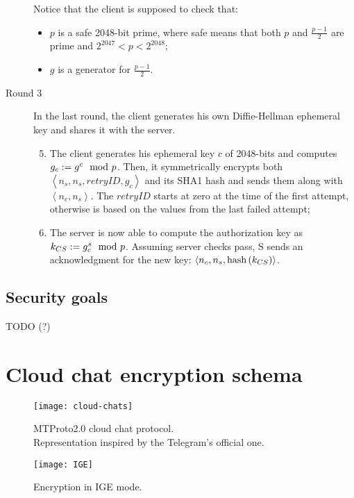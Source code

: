 \begin{description}
        Notice that the client is supposed to check that:
        \begin{itemize}
            \label{item:DH-clients-checks}
            \item{$p$ is a safe 2048-bit prime, where safe means that both $p$ and $\frac{p-1}{2}$ are prime and $2^{2047} < p < 2^{2048}$;}
            \item{$g$ is a generator for $\frac{p-1}{2}$.}
        \end{itemize}

    \item[Round 3] In the last round, the client generates his own Diffie-Hellman ephemeral key and shares it with the server.
        \begin{enumerate}
            \setcounter{enumi}{4}
            \item{The client generates his ephemeral key $c$ of 2048-bits and computes $g_c:= g^c \mod{p}$. Then, it symmetrically encrypts both $\left<n_s, n_s, retryID, g_c\right>$ and its SHA1 hash and sends them along with $\left<n_c, n_s\right>$. The $retryID$ starts at zero at the time of the first attempt, otherwise is based on the values from the last failed attempt;}
            \item{The server is now able to compute the authorization key as $k_{CS}:= g_c^s \mod{p}$. Assuming server checks pass, S sends an acknowledgment for the new key: $\left<n_c, n_s, \mbox{hash}\left(k_{CS}\right)\right>$.}
        \end{enumerate}

\end{description}


\subsection{Security goals}
TODO (?)



\section{Cloud chat encryption schema}
\label{sec:cloud-chat}

\begin{figure}[t]
    \centering
    \texttt{[image: cloud-chats]}
    \caption{MTProto2.0 cloud chat protocol.\\Representation inspired by the Telegram's official one.}
    \label{fig:cloud-chat-protocol}
\end{figure}
\begin{figure}[t]
    \centering
    \texttt{[image: IGE]}
    \caption{Encryption in IGE mode.}
    \label{fig:IGE}
\end{figure}

